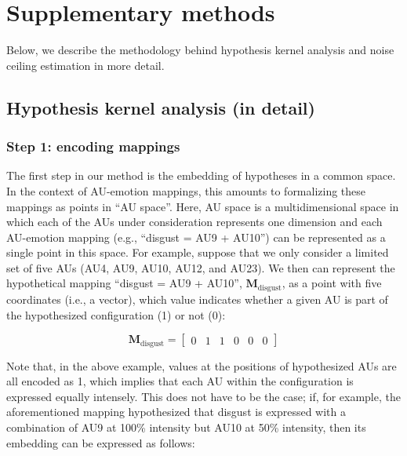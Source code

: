 \documentclass[12pt,american,a4paper,oneside,]{memoir} %
\begin{document}
\hypertarget{hka-supplementary-methods}{%
\section{Supplementary methods}\label{hka-supplementary-methods}}

Below, we describe the methodology behind hypothesis kernel analysis and noise ceiling estimation in more detail.

\hypertarget{hypothesis-kernel-analysis-in-detail}{%
\subsection{Hypothesis kernel analysis (in detail)}\label{hypothesis-kernel-analysis-in-detail}}

\hypertarget{step-1-encoding-mappings}{%
\subsubsection{Step 1: encoding mappings}\label{step-1-encoding-mappings}}

The first step in our method is the embedding of hypotheses in a common space. In the context of AU-emotion mappings, this amounts to formalizing these mappings as points in ``AU space''. Here, AU space is a multidimensional space in which each of the AUs under consideration represents one dimension and each AU-emotion mapping (e.g., ``disgust = AU9 + AU10'') can be represented as a single point in this space. For example, suppose that we only consider a limited set of five AUs (AU4, AU9, AU10, AU12, and AU23). We then can represent the hypothetical mapping ``disgust = AU9 + AU10'', \(\mathbf{M}_{\mathrm{disgust}}\), as a point with five coordinates (i.e., a vector), which value indicates whether a given AU is part of the hypothesized configuration (1) or not (0):

\begin{equation}
\mathbf{M}_{\mathrm{disgust}} = \begin{bmatrix} 0 & 1 & 1 & 0 & 0 & 0 \end{bmatrix}
\end{equation}

Note that, in the above example, values at the positions of hypothesized AUs are all encoded as 1, which implies that each AU within the configuration is expressed equally intensely. This does not have to be the case; if, for example, the aforementioned mapping hypothesized that disgust is expressed with a combination of AU9 at 100\% intensity but AU10 at 50\% intensity, then its embedding can be expressed as follows:
\end{document}
